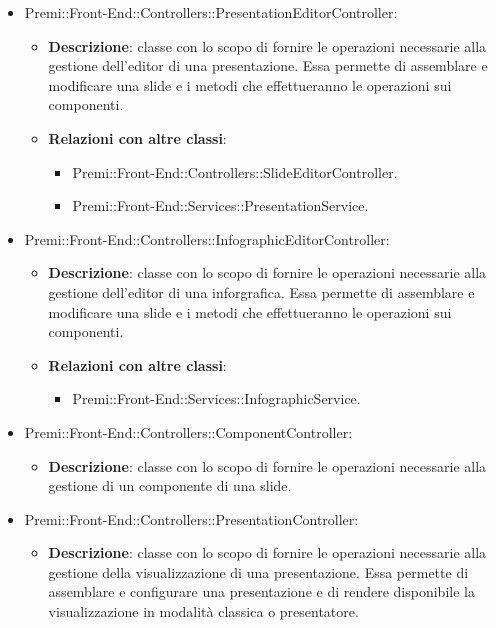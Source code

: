 \begin{itemize}
		\item  Premi::Front-End::Controllers::PresentationEditorController: 
			 \begin{itemize}
				\item \textbf{Descrizione}: classe con lo scopo di fornire le operazioni necessarie alla gestione dell'editor di una presentazione. Essa permette di assemblare e modificare una \gls{slide} e i metodi che effettueranno le operazioni sui componenti.
				\item \textbf{Relazioni con altre classi}:
				\begin{itemize}
					\item Premi::Front-End::Controllers::SlideEditorController.
					\item Premi::Front-End::Services::PresentationService.
				\end{itemize}
			\end{itemize}
		\item  Premi::Front-End::Controllers::InfographicEditorController: 
			 \begin{itemize}
				\item \textbf{Descrizione}: classe con lo scopo di fornire le operazioni necessarie alla gestione dell'editor di una inforgrafica. Essa permette di assemblare e modificare una \gls{slide} e i metodi che effettueranno le operazioni sui componenti.
				\item \textbf{Relazioni con altre classi}:
				\begin{itemize}
					\item Premi::Front-End::Services::InfographicService.
				\end{itemize}
			\end{itemize}
		\item  Premi::Front-End::Controllers::ComponentController: 
			\begin{itemize}
				\item \textbf{Descrizione}: classe con lo scopo di fornire le operazioni necessarie alla gestione di un componente di una \gls{slide}.
			\end{itemize}
		\item  Premi::Front-End::Controllers::PresentationController: 
			 \begin{itemize}
				\item \textbf{Descrizione}: classe con lo scopo di fornire le operazioni necessarie alla gestione della visualizzazione di una presentazione. Essa permette di assemblare e configurare una presentazione e di rendere disponibile la visualizzazione in modalità classica o presentatore.

\end{itemize}
\end{itemize}
